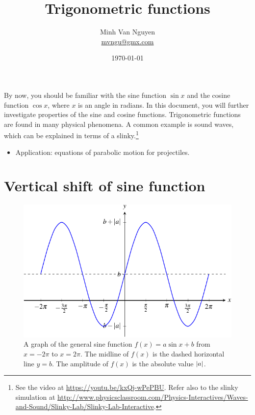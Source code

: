 \documentclass[a4paper,oneside,12pt]{article}
\begin{document}
\title{\Large\bf Trigonometric functions}
\author{%
  Minh Van Nguyen \\
  \url{mvngu@gmx.com}
}
\date{\today}
\maketitle

\noindent
By now, you should be familiar with the sine function $\sin x$ and the
cosine function $\cos x$, where $x$ is an angle in radians.  In this
document, you will further investigate properties of the sine and
cosine functions.  Trigonometric functions are found in many physical
phenomena.  A common example is sound waves, which can be explained in
terms of a slinky.\footnote{
  See the video at
  \url{https://youtu.be/kxQj-wPePBU}.  Refer also to the slinky
  simulation at
  \url{http://www.physicsclassroom.com/Physics-Interactives/Waves-and-Sound/Slinky-Lab/Slinky-Lab-Interactive}.
}

\begin{itemize}
\item Application: equations of parabolic motion for projectiles.
\end{itemize}



\section{Vertical shift of sine function}

\begin{figure}[!htbp]
\centering
\includegraphics[scale=1.1]{image/13/a-sin-b.pdf}
\caption{%
  A graph of the general sine function
  $f(x) = a \sin x + b$ from $x = -2\pi$ to $x = 2\pi$.  The midline
  of $f(x)$ is the dashed horizontal line $y = b$.  The amplitude of
  $f(x)$ is the absolute value $\lvert a\rvert$.
}
\label{fig:trigonometric:general_sine}
\end{figure}
\end{document}
